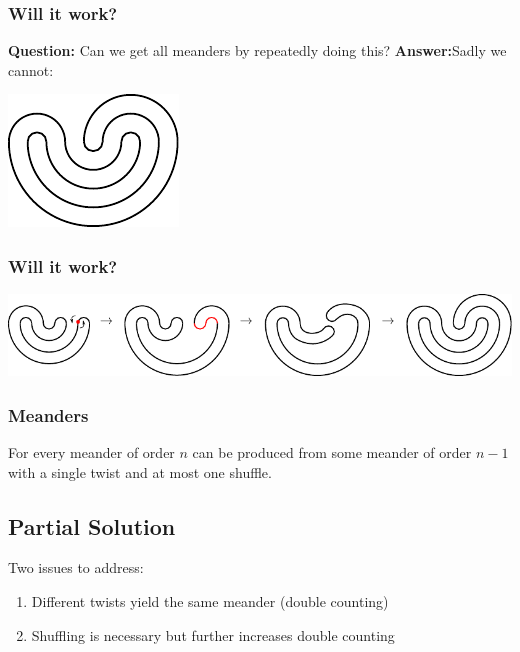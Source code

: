 \documentclass{beamer}
\begin{document}
\begin{frame}
\frametitle{Will it work?}
\textbf{Question:} Can we get all meanders by repeatedly doing this?
\pause
\pause\textbf{Answer:}\pause Sadly we cannot:

\begin{center}
\includegraphics[width=.4\textwidth]{meanders/5-example.pdf}
\end{center}

\end{frame}

\begin{frame}
\frametitle{Will it work?}
\begin{center}
\includegraphics[width=\textwidth]{meanders/5-shuffle.pdf}
\end{center}

\end{frame}

\begin{frame}
\frametitle{Meanders}
\begin{theorem}
For every meander of order $n$ can be produced from some meander of order $n-1$ with a single twist and at most one shuffle.
\end{theorem}
\end{frame}

\subsection{Partial Solution}
\begin{frame}
Two issues to address:
\begin{enumerate}
\item Different twists yield the same meander (double counting)
\item Shuffling is necessary but further increases double counting
\end{enumerate}
\end{frame}
\end{document}
